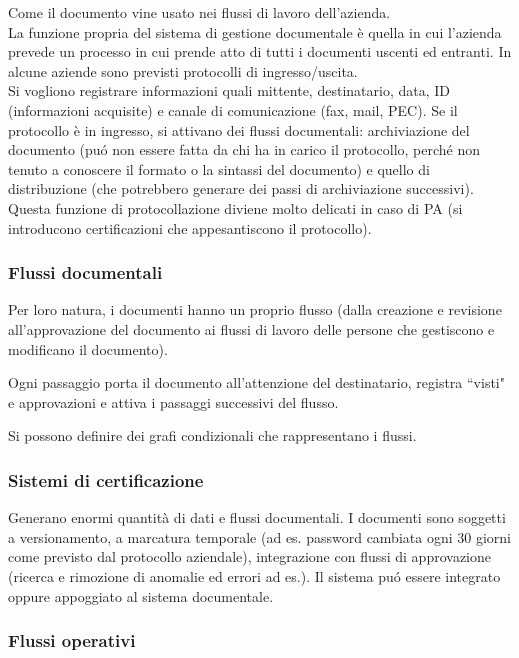 Come il documento vine usato nei flussi di lavoro dell'azienda.\\
La funzione propria del sistema di gestione documentale \`e quella in cui
l'azienda prevede un processo in cui prende atto di tutti i documenti
uscenti ed entranti. In alcune aziende sono previsti protocolli di 
ingresso/uscita.\\

Si vogliono registrare informazioni quali mittente, destinatario, data, ID 
(informazioni acquisite) e canale di comunicazione (fax, mail, PEC). 
Se il protocollo \`e in ingresso, si attivano dei flussi documentali: 
archiviazione del documento (pu\'o non essere fatta da chi ha in carico il 
protocollo, perch\'e non tenuto a conoscere il formato o la sintassi del 
documento) e quello di distribuzione (che potrebbero generare dei passi di 
archiviazione successivi).\\
Questa funzione di protocollazione diviene molto delicati in caso di PA
(si introducono certificazioni che appesantiscono il protocollo).

\subsubsection{Flussi documentali}

Per loro natura, i documenti hanno un proprio flusso (dalla creazione e
revisione all'approvazione del documento ai flussi di lavoro delle
persone che gestiscono e modificano il documento).

Ogni passaggio porta il documento all'attenzione del destinatario, registra 
``visti" e approvazioni e attiva i passaggi successivi del flusso.

Si possono definire dei grafi condizionali che rappresentano i flussi.

\subsubsection{Sistemi di
certificazione}

Generano enormi quantit\`a di dati e flussi documentali. I documenti sono 
soggetti a versionamento, a marcatura temporale (ad es. password cambiata ogni 
30 giorni come previsto dal protocollo aziendale), integrazione con flussi di
approvazione (ricerca e rimozione di anomalie ed errori ad es.). Il
sistema pu\'o essere integrato oppure appoggiato al sistema documentale.

\subsubsection{Flussi operativi}

